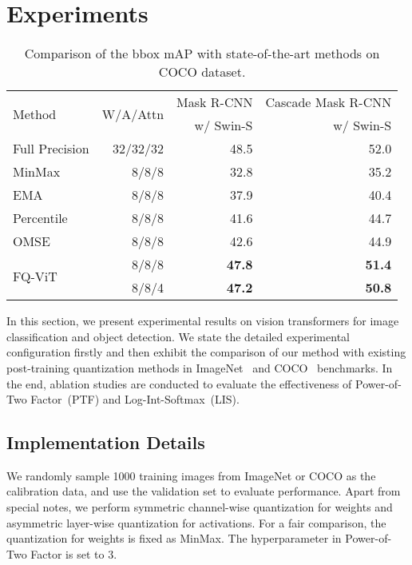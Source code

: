 \documentclass{article}
\begin{document}
\section{Experiments}

\begin{table*}[t]
\centering
\small
\begin{tabular}{lrrr}
\toprule
\multirow{2}{*}{Method}  & \multirow{2}{*}{W/A/Attn}    & Mask R-CNN & Cascade Mask R-CNN \\
& & w/ Swin-S& w/ Swin-S\\
\midrule
\rowcolor{c_gray} Full Precision    & 32/32/32      & 48.5                & 52.0                   \\
\midrule
MinMax            & 8/8/8         & 32.8                & 35.2                   \\
EMA~\cite{jacob2018quantization}               & 8/8/8         & 37.9                & 40.4                   \\
Percentile~\cite{li2019fully}        & 8/8/8         & 41.6                & 44.7                   \\
OMSE~\cite{choukroun2019low}              & 8/8/8         & 42.6                & 44.9                   \\
\midrule
\multirow{2}{*}{FQ-ViT}      & 8/8/8         & \textbf{47.8}       & \textbf{51.4}          \\
 & 8/8/4         & \textbf{47.2}       & \textbf{50.8}  \\
\bottomrule
\end{tabular}
\caption{Comparison of the bbox mAP with state-of-the-art methods on COCO dataset.}
\label{tab:coco}
\end{table*}


In this section, we present experimental results on vision transformers for image classification and object detection. We state the detailed experimental configuration firstly and then exhibit the comparison of our method with existing post-training quantization methods in ImageNet~\cite{krizhevsky2012imagenet} and COCO~\cite{lin2014microsoft} benchmarks. In the end, ablation studies are conducted to evaluate the effectiveness of Power-of-Two Factor~(PTF) and Log-Int-Softmax~(LIS).

\subsection{Implementation Details}


We randomly sample 1000 training images from ImageNet or COCO as the calibration data, and use the validation set to evaluate performance.
Apart from special notes, we perform symmetric channel-wise quantization for weights and asymmetric layer-wise quantization for activations. For a fair comparison, the quantization for weights is fixed as MinMax.
The hyperparameter  in Power-of-Two Factor is set to 3.
\end{document}

